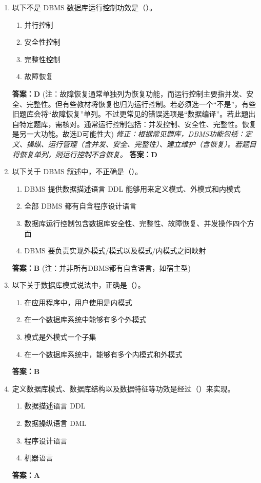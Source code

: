 \documentclass[12pt, a4paper]{article}
\begin{document}
\begin{enumerate}[label=\arabic*.]
    \item 以下不是 DBMS 数据库运行控制功效是（\quad）。
    \begin{enumerate}
        \item 并行控制
        \item 安全性控制
        \item 完整性控制
        \item 故障恢复
    \end{enumerate}
    \textbf{答案：D} (注：故障恢复通常单独列为恢复功能，而运行控制主要指并发、安全、完整性。但有些教材将恢复也归为运行控制。若必须选一个“不是”，有些旧题库会将“故障恢复”单列。不过更常见的错误选项是“数据编译”。若此题出自特定题库，需核对。通常运行控制包括：并发控制、安全性、完整性。恢复是另一大功能。故选D可能性大)
    \textit{修正：根据常见题库，DBMS功能包括：定义、操纵、运行管理（含并发、安全、完整性）、建立维护（含恢复）。若题目将恢复单列，则运行控制不含恢复。}
    \textbf{答案：D}

    \item 以下关于 DBMS 叙述中，不正确是（\quad）。
    \begin{enumerate}
        \item DBMS 提供数据描述语言 DDL 能够用来定义模式、外模式和内模式
        \item 全部 DBMS 都有自含程序设计语言
        \item 数据库运行控制包含数据库安全性、完整性、故障恢复、并发操作四个方面
        \item DBMS 要负责实现外模式/模式以及模式/内模式之间映射
    \end{enumerate}
    \textbf{答案：B} (注：并非所有DBMS都有自含语言，如宿主型)

    \item 以下关于数据库模式说法中，正确是（\quad）。
    \begin{enumerate}
        \item 在应用程序中，用户使用是内模式
        \item 在一个数据库系统中能够有多个外模式
        \item 模式是外模式一个子集
        \item 在一个数据库系统中，能够有多个内模式和外模式
    \end{enumerate}
    \textbf{答案：B}

    \item 定义数据库模式、数据库结构以及数据特征等功效是经过（\quad）来实现。
    \begin{enumerate}
        \item 数据描述语言 DDL
        \item 数据操纵语言 DML
        \item 程序设计语言
        \item 机器语言
    \end{enumerate}
    \textbf{答案：A}


\end{enumerate}
\end{document}

